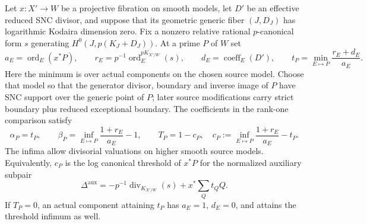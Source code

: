 \begin{lemma}
\label{lem:rankone-normalization}
Let $x:X'\to W$ be a projective fibration on smooth models, let $D'$ be
an effective reduced SNC divisor, and suppose that its geometric generic
fiber $(J,D_J)$ has logarithmic Kodaira dimension zero. Fix a nonzero
relative rational $p$-canonical form $s$ generating
$H^0(J,p(K_J+D_J))$. At a prime $P$ of $W$ set
\[
 a_E=\operatorname{ord}_E(x^*P),\qquad
 r_E=p^{-1}\operatorname{ord}^{pK_{X'/W}}_E(s),\qquad
 d_E=\operatorname{coeff}_E(D'),\qquad
 t_P=\min_{E\mapsto P}\frac{r_E+d_E}{a_E}.
\]
Here the minimum is over actual components on the chosen source model.
Choose that model so that the generator divisor, boundary and inverse
image of $P$ have SNC support over the generic point of $P$; later
source modifications carry strict boundary plus reduced exceptional
boundary. The coefficients in the rank-one comparison satisfy
\[
 \alpha_P=t_P,\qquad
 \beta_P=\inf_{E\mapsto P}\frac{1+r_E}{a_E}-1,\qquad
 T_P=1-c_P,
 \quad
 c_P:=\inf_{E\mapsto P}\frac{1+r_E}{a_E}-t_P.
\]
The infima allow divisorial valuations on higher smooth source models.
Equivalently, $c_P$ is the log canonical threshold of $x^*P$ for the
normalized auxiliary subpair
\[
 \Delta^{\mathrm{aux}}
 =-p^{-1}\operatorname{div}_{K_{X'/W}}(s)+x^*\sum_Qt_QQ.
\]
If $T_P=0$, an actual component attaining $t_P$ has
$a_E=1$, $d_E=0$, and attains the threshold infimum as well.
\end{lemma}

